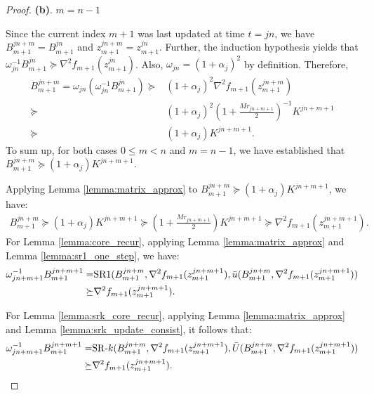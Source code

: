 \documentclass[letterpaper]{article} %
\theoremstyle{plain}
\theoremstyle{definition}
\theoremstyle{remark}
\begin{document}
\begin{proof}
    \textbf{(b)}. $m = n - 1$

    Since the current index $m + 1$ was last updated at time $t = j n$, we have $B_{m + 1}^{j n + m} = B_{m + 1}^{j n}$ and $z_{m + 1}^{j n + m} = z_{m + 1}^{j n}$. Further, the induction hypothesis yields that $\omega_{j n}^{-1} B_{m+1}^{j n} \succeq \nabla^2 f_{m+1} (z_{m + 1}^{j n})$. Also, $\omega_{j n} = (1 + \alpha_j)^2$ by definition. Therefore,
    \begin{align*}
        B_{m+1}^{j n + m} = \omega_{j n} (\omega_{j n}^{-1} B_{m + 1}^{j n}) \succeq& (1 + \alpha_j)^2 \nabla^2 f_{m+1}(z_{m+1}^{j n + m}) \\
        \succeq & (1 + \alpha_j)^2 (1 + \frac{M r_{j n + m + 1}}{2})^{-1} K^{j n + m + 1} \\
        \succeq & (1 + \alpha_j) K^{j n + m + 1}.
    \end{align*}
    To sum up, for both cases $0 \leq m < n$ and $m = n - 1$, we have established that $B_{m+1}^{j n + m} \succeq (1 + \alpha_j) K^{j n + m + 1}$.

    Applying Lemma \ref{lemma:matrix_approx} to $B_{m+1}^{j n + m} \succeq (1 + \alpha_j)K^{j n + m + 1}$, we have:
    \begin{align*}
        B_{m+1}^{j n + m} \succeq (1 + \alpha_j) K^{j n + m + 1} \succeq \left(1 + \frac{M r_{j n + m + 1}}{2} \right) K^{j n + m + 1} \succeq \nabla^2 f_{m+1}(z_{m+1}^{j n + m + 1}).
    \end{align*}
    For Lemma \ref{lemma:core_recur}, applying Lemma \ref{lemma:matrix_approx} and Lemma \ref{lemma:sr1_one_step}, we have:
    \begin{align*}
        \omega_{j n + m + 1}^{-1} B_{m + 1}^{j n + m + 1} = & \mathrm{SR1} (B_{m+1}^{j n + m}, \nabla^2 f_{m+1} (z_{m+1}^{j n + m + 1}), \Bar{u}(B_{m+1}^{j n + m}, \nabla^2 f_{m+1} (z_{m+1}^{j n + m + 1}) ) \\
        \succeq & \nabla^2 f_{m+1} (z_{m+1}^{j n + m + 1}).
    \end{align*}

    For Lemma \ref{lemma:srk_core_recur}, applying Lemma \ref{lemma:matrix_approx} and Lemma \ref{lemma:srk_update_consist}, it follows that:
    \begin{align*}
        \omega_{j n + m + 1}^{-1} B_{m + 1}^{j n + m + 1} = & \mathrm{SR}\textrm{-}k (B_{m+1}^{j n + m}, \nabla^2 f_{m+1} (z_{m+1}^{j n + m + 1}), \Bar{U}(B_{m+1}^{j n + m}, \nabla^2 f_{m+1} (z_{m+1}^{j n + m + 1}) ) \\
        \succeq & \nabla^2 f_{m+1} (z_{m+1}^{j n + m + 1}).
    \end{align*}


\end{proof}
\end{document}
